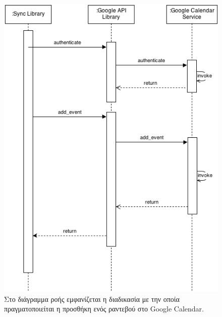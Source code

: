 \begin{figure}[!htb]
\centering
\includegraphics[width=150mm]{images/sd-sync-appointment.png}
\caption{Στο διάγραμμα ροής εμφανίζεται η διαδικασία με την οποία πραγματοποιείται η προσθήκη ενός ραντεβού στο Google Calendar.}
\label{sd-save-appointment}
\end{figure}
